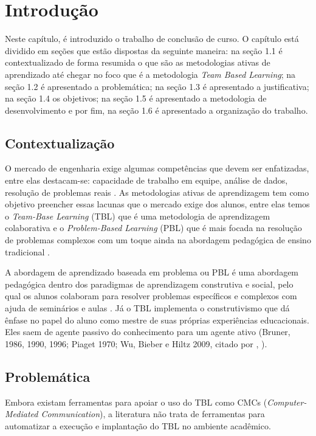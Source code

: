 \chapter[Introdução]{Introdução}

Neste capítulo, é introduzido o trabalho de conclusão de curso. O capítulo está dividido em seções que estão dispostas da seguinte maneira: na seção 1.1 é contextualizado de forma resumida o que são as metodologias ativas de aprendizado até chegar no foco que é a metodologia \textit{Team Based Learning}; na seção 1.2 é apresentado a problemática; na seção 1.3 é apresentado a justificativa; na seção 1.4 os objetivos; na seção 1.5 é apresentado a metodologia de desenvolvimento e por fim, na seção 1.6 é apresentado a organização do trabalho.

\section{Contextualização}

O mercado de engenharia exige algumas competências que devem ser enfatizadas, entre elas destacam-se: capacidade de
trabalho em equipe, análise de dados, resolução de problemas reais \cite{davis}. As metodologias ativas de aprendizagem
tem como objetivo preencher essas lacunas que o mercado exige dos alunos, entre elas temos o \textit{Team-Base Learning}
(TBL) que é uma metodologia de aprendizagem colaborativa e o \textit{Problem-Based Learning} (PBL) que é mais focada na resolução de problemas complexos com um toque ainda na abordagem pedagógica de ensino tradicional \cite{cabrera}.

A abordagem de aprendizado baseada em problema ou PBL é uma abordagem pedagógica dentro dos paradigmas de aprendizagem
construtiva e social, pelo qual os alunos colaboram para resolver problemas específicos e complexos com ajuda de
seminários e aulas \cite{gomez}. Já o TBL implementa o construtivismo que dá ênfase no papel do aluno como mestre de
suas próprias experiências educacionais. Eles saem de agente passivo do conhecimento para um agente ativo (Bruner, 1986,
1990, 1996; Piaget 1970; Wu, Bieber e Hiltz 2009, citado por \citeauthor{gomez}, \citeyear{gomez}).

\section{Problemática}

Embora existam ferramentas para apoiar o uso do TBL como CMCs (\textit{Computer-Mediated Communication}), a literatura não trata de ferramentas para automatizar a execução e implantação do TBL no ambiente acadêmico.

